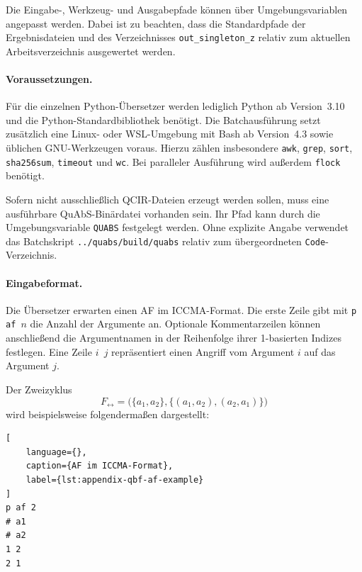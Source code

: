 Die Eingabe-, Werkzeug- und Ausgabepfade können über
Umgebungsvariablen angepasst werden. Dabei ist zu beachten, dass die
Standardpfade der Ergebnisdateien und des Verzeichnisses
\texttt{out\_singleton\_z} relativ zum aktuellen Arbeitsverzeichnis
ausgewertet werden.

\paragraph{Voraussetzungen.}

Für die einzelnen Python-Übersetzer werden lediglich Python ab
Version~3.10 und die Python-Standardbibliothek benötigt. Die
Batchausführung setzt zusätzlich eine Linux- oder WSL-Umgebung mit
Bash ab Version~4.3 sowie üblichen GNU-Werkzeugen voraus. Hierzu zählen
insbesondere \texttt{awk}, \texttt{grep}, \texttt{sort},
\texttt{sha256sum}, \texttt{timeout} und \texttt{wc}. Bei paralleler
Ausführung wird außerdem \texttt{flock} benötigt.

Sofern nicht ausschließlich QCIR-Dateien erzeugt werden sollen, muss
eine ausführbare QuAbS-Binärdatei vorhanden sein. Ihr Pfad kann durch
die Umgebungsvariable \texttt{QUABS} festgelegt werden. Ohne explizite
Angabe verwendet das Batchskript
\texttt{../quabs/build/quabs} relativ zum übergeordneten
\texttt{Code}-Verzeichnis.


\paragraph{Eingabeformat.}

Die Übersetzer erwarten einen AF im ICCMA-Format. Die erste Zeile gibt
mit \texttt{p af \(n\)} die Anzahl der Argumente an. Optionale
Kommentarzeilen können anschließend die Argumentnamen in der
Reihenfolge ihrer 1-basierten Indizes festlegen. Eine Zeile
\texttt{\(i\) \(j\)} repräsentiert einen Angriff vom Argument \(i\) auf
das Argument \(j\).

\begin{Example}
\label{ex:appendix-qbf-af-input}
Der Zweizyklus
\[
F_{\leftrightarrow}
=
\bigl(
    \{a_1,a_2\},
    \{(a_1,a_2),(a_2,a_1)\}
\bigr)
\]
wird beispielsweise folgendermaßen dargestellt:
\begin{lstlisting}[
    language={},
    caption={AF im ICCMA-Format},
    label={lst:appendix-qbf-af-example}
]
p af 2
# a1
# a2
1 2
2 1
\end{lstlisting}
\end{Example}

